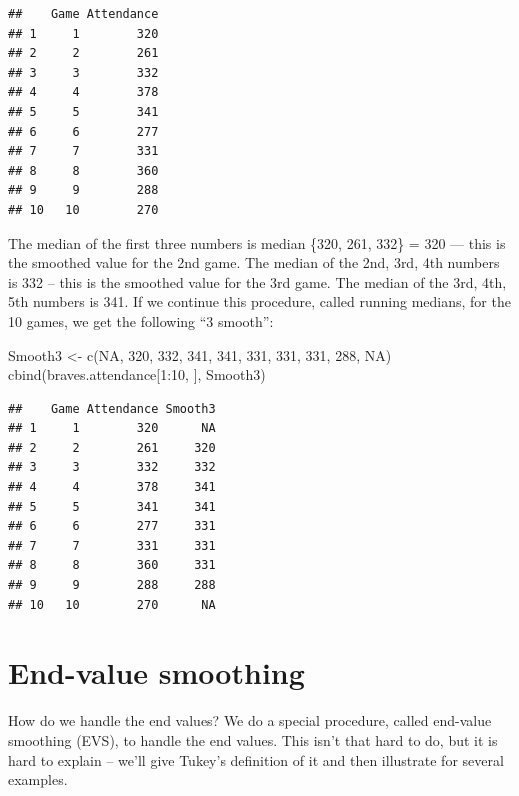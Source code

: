 \documentclass[
]{book}
\newenvironment{Shaded}{\begin{snugshade}}{\end{snugshade}}
\newcommand{\ConstantTok}[1]{\textcolor[rgb]{0.00,0.00,0.00}{#1}}
\newcommand{\DecValTok}[1]{\textcolor[rgb]{0.00,0.00,0.81}{#1}}
\newcommand{\FunctionTok}[1]{\textcolor[rgb]{0.00,0.00,0.00}{#1}}
\newcommand{\NormalTok}[1]{#1}
\newcommand{\OtherTok}[1]{\textcolor[rgb]{0.56,0.35,0.01}{#1}}
\newcommand{\SpecialCharTok}[1]{\textcolor[rgb]{0.00,0.00,0.00}{#1}}
\begin{document}
\begin{verbatim}
##    Game Attendance
## 1     1        320
## 2     2        261
## 3     3        332
## 4     4        378
## 5     5        341
## 6     6        277
## 7     7        331
## 8     8        360
## 9     9        288
## 10   10        270
\end{verbatim}

The median of the first three numbers is median \{320, 261, 332\} = 320 --- this is the smoothed value for the 2nd game. The median of the 2nd, 3rd, 4th numbers is 332 -- this is the smoothed value for the 3rd game. The median of the 3rd, 4th, 5th numbers is 341. If we continue this procedure, called running medians, for the 10 games, we get the following ``3 smooth'':

\begin{Shaded}
\begin{Highlighting}[]
\NormalTok{Smooth3 }\OtherTok{\textless{}{-}} \FunctionTok{c}\NormalTok{(}\ConstantTok{NA}\NormalTok{, }\DecValTok{320}\NormalTok{, }\DecValTok{332}\NormalTok{, }\DecValTok{341}\NormalTok{, }\DecValTok{341}\NormalTok{, }\DecValTok{331}\NormalTok{, }\DecValTok{331}\NormalTok{, }\DecValTok{331}\NormalTok{, }\DecValTok{288}\NormalTok{, }\ConstantTok{NA}\NormalTok{)}
\FunctionTok{cbind}\NormalTok{(braves.attendance[}\DecValTok{1}\SpecialCharTok{:}\DecValTok{10}\NormalTok{, ], Smooth3)}
\end{Highlighting}
\end{Shaded}

\begin{verbatim}
##    Game Attendance Smooth3
## 1     1        320      NA
## 2     2        261     320
## 3     3        332     332
## 4     4        378     341
## 5     5        341     341
## 6     6        277     331
## 7     7        331     331
## 8     8        360     331
## 9     9        288     288
## 10   10        270      NA
\end{verbatim}

\hypertarget{end-value-smoothing}{%
\section{End-value smoothing}\label{end-value-smoothing}}

How do we handle the end values? We do a special procedure, called end-value smoothing (EVS), to handle the end values. This isn't that hard to do, but it is hard to explain -- we'll give Tukey's definition of it and then illustrate for several examples.
\end{document}
